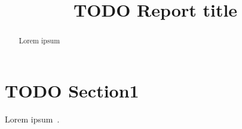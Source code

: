 \documentclass[a4paper,10pt]{article}
\begin{document}
\vspace{0.5cm}
{}
\pdsemailtwo{\vspace*{-1cm}}
\newcommand{\authornameshort}{TODO Author1 et al.}
\newcommand{\reporttitle}{TODO Report title}
\newcommand{\reporttitleshort}{TODO Short report title}
\newcommand{\copyrighttext}{}
\newcommand{\authorwebpage}{}
\title{\reporttitle} %
\maketitle %



\begin{abstract}
	Lorem ipsum
\end{abstract}

\newpage
\tableofcontents
\newpage
\listoffigures
\listoftables
\newpage

\section{TODO Section1}
Lorem ipsum~\cite{zaharia2008improving}.



\end{document}
